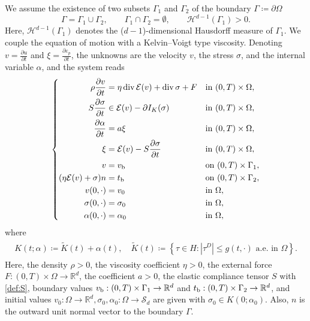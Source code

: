 \documentclass[11pt, a4paper]{article}
\newcommand{\R}{{\mathbb R}}
\newcommand{\Sym}{{\mathcal S}}
\newcommand{\defeq}{\coloneqq}
\newcommand{\prz}[2]{ \frac{\partial{#1}}{\partial{#2}} }
\newcommand{\dvg}{\operatorname{div}}
\newcommand{\DS}{\displaystyle}
\newcommand{\E}{{\mathcal{E}}}
\newcommand{\Hs}{{H}}
\newcommand{\eps}{\varepsilon}
\begin{document}
We assume the existence of two subsets $\Gamma_1$ and $\Gamma_2$ of the boundary $\Gamma\defeq\partial\Omega$
\[
    \Gamma=\Gamma_1\cup\Gamma_2, \qquad
    \Gamma_1\cap\Gamma_2=\emptyset, \qquad
    \mathcal{H}^{d-1}(\Gamma_1)>0.
\]
Here, $\mathcal{H}^{d-1}(\Gamma_1)$ denotes the ($d-1$)-dimensional Hausdorff measure of $\Gamma_1$.
We couple the equation of motion with a Kelvin--Voigt type viscosity. Denoting $v=\prz{u}{t}$ and $\xi=\prz{\eps_p}{t}$, the unknowns are the velocity $v$, the stress $\sigma$, and the internal variable $\alpha$, and the system reads
%
\begin{align*}
\left\{\begin{aligned}
    \rho\prz{v}{t} &= \eta\dvg\E(v) + \dvg\sigma + F &&\mbox{in }(0,T)\times\Omega,\\
    S\prz{\sigma}{t} &\in \E(v) - \partial I_K(\sigma) &&\mbox{in }(0,T)\times\Omega,\\
    \prz{\alpha}{t} &= a\xi
    &&\mbox{in }(0,T)\times\Omega,\\
    \xi &= \E(v) - S\prz{\sigma}{t}
    &&\mbox{in }(0,T)\times\Omega,\\
    v &=v_{\rm b} &&\mbox{on }(0,T)\times\Gamma_1,\\
    (\eta\E(v) + \sigma) n &=t_{\rm b} &&\mbox{on }(0,T)\times\Gamma_2,\\
    v(0,\cdot) &= v_0 &&\mbox{in }\Omega,\\
    \sigma(0,\cdot) &= \sigma_0 &&\mbox{in }\Omega,\\
    \alpha(0,\cdot) &= \alpha_0 &&\mbox{in }\Omega,\\
\end{aligned}\right.
\end{align*}
where 
\begin{align*}\begin{array}{c}
    {\DS K(t;\alpha) \defeq \tilde{K}(t) + \alpha(t),\quad 
    \tilde{K}(t) \defeq \left\{\tau\in\Hs : |\tau^D|\le g(t,\cdot)\mbox{ a.e. in }\Omega\right\}.}
\end{array}\end{align*}
Here, 
the density $\rho>0$,
the viscosity coefficient $\eta>0$,
the external force $F:(0,T)\times\Omega\rightarrow\R^d$,
the coefficient $a > 0$,
the elastic compliance tensor $S$ with \eqref{def:S},
boundary values $v_{\rm b}:(0,T)\times\Gamma_1\rightarrow\R^d$ and 
$t_{\rm b}:(0,T)\times\Gamma_2\rightarrow\R^d$, and
initial values $v_0:\Omega\rightarrow \R^d, \sigma_0, \alpha_0:\Omega\rightarrow \Sym_d$ are given with $\sigma_0 \in K(0;\alpha_0)$. Also, $n$ is the outward unit normal vector to the boundary $\Gamma$.
\end{document}
